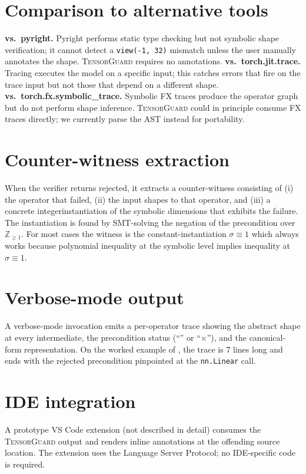 \documentclass{article}
\theoremstyle{definition}
\begin{document}
\section{Comparison to alternative tools}\label{sec:alt-tools}
\textbf{vs.\ pyright.} Pyright performs static type checking but
not symbolic shape verification; it cannot detect a
\verb|view(-1, 32)| mismatch unless the user manually annotates
the shape. \textsc{TensorGuard} requires no annotations.
\textbf{vs.\ torch.jit.trace.} Tracing executes the model on a
specific input; this catches errors that fire on the trace input
but not those that depend on a different shape.
\textbf{vs.\ torch.fx.symbolic\_trace.} Symbolic FX traces produce
the operator graph but do not perform shape inference.
\textsc{TensorGuard} could in principle consume FX traces directly;
we currently parse the AST instead for portability.

\section{Counter-witness extraction}\label{sec:witness}
When the verifier returns \textsf{rejected}, it extracts a
counter-witness consisting of (i) the operator that failed,
(ii) the input shapes to that operator, and (iii) a concrete
integerinstantiation of the symbolic dimensions that exhibits the
failure. The instantiation is found by SMT-solving the negation
of the precondition over $\mathbb Z_{\ge 1}$. For most cases the
witness is the constant-instantiation $\sigma\equiv 1$ which
always works because polynomial inequality at the symbolic level
implies inequality at $\sigma\equiv 1$.

\section{Verbose-mode output}\label{sec:verbose-out}
A verbose-mode invocation emits a per-operator trace showing the
abstract shape at every intermediate, the precondition status
(``\checkmark'' or ``$\times$''), and the canonical-form
representation. On the worked example of ,
the trace is $7$ lines long and ends with the rejected
precondition pinpointed at the \verb|nn.Linear| call.

\section{IDE integration}\label{sec:ide}
A prototype VS Code extension (not described in detail) consumes
the \textsc{TensorGuard} output and renders inline annotations
at the offending source location. The extension uses the
Language Server Protocol; no IDE-specific code is required.
\end{document}
